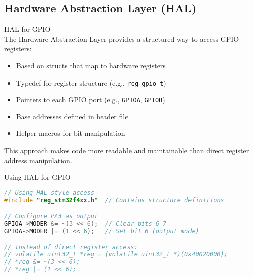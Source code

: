 \subsection{Hardware Abstraction Layer (HAL)}

\begin{concept}{HAL for GPIO}\\
The Hardware Abstraction Layer provides a structured way to access GPIO registers:
\begin{itemize}
    \item Based on structs that map to hardware registers
    \item Typedef for register structure (e.g., \texttt{reg\_gpio\_t})
    \item Pointers to each GPIO port (e.g., \texttt{GPIOA}, \texttt{GPIOB})
    \item Base addresses defined in header file
    \item Helper macros for bit manipulation
\end{itemize}
This approach makes code more readable and maintainable than direct register address manipulation.
\end{concept}

\begin{code}{Using HAL for GPIO}
\begin{lstlisting}[language=C, style=basesmol] 
// Using HAL style access
#include "reg_stm32f4xx.h"  // Contains structure definitions

// Configure PA3 as output
GPIOA->MODER &= ~(3 << 6);  // Clear bits 6-7
GPIOA->MODER |= (1 << 6);   // Set bit 6 (output mode)

// Instead of direct register access:
// volatile uint32_t *reg = (volatile uint32_t *)(0x40020000);
// *reg &= ~(3 << 6);
// *reg |= (1 << 6);
\end{lstlisting}
\end{code}
